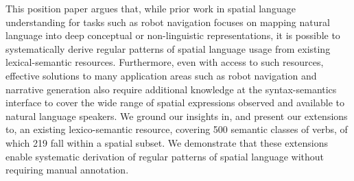 This position paper argues that, while prior work in spatial language understanding for tasks such as robot navigation focuses on mapping natural language into deep conceptual or non-linguistic representations, it is possible to systematically derive regular patterns of spatial language usage from existing lexical-semantic resources. Furthermore, even with access to such resources, effective solutions to many application areas such as robot navigation and narrative generation also require additional knowledge at the syntax-semantics interface to cover the wide range of spatial expressions observed and available to natural language speakers. We ground our insights in, and present our extensions to, an existing lexico-semantic resource, covering 500 semantic classes of verbs, of which 219 fall within a spatial subset. We demonstrate that these extensions enable systematic derivation of regular patterns of spatial language without requiring manual annotation.
